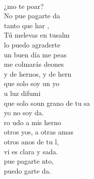 \begin{cancion}%
	    \\
	¿mo te poar?  \\
	No pue pagarte da   \\
	 tanto que har , \\
	Tú melevas en tusalm  \\
\jump
	lo puedo agraderte\\
	un buen día me peas\\
	me colmarás deones\\
	y de hernos, y de hern  \\
\jump
	 que solo soy un yo  \\
	u luz difumi\\
	 que solo soun grano de tu sa \\
	yo no soy da.\\
	ro udo a mis herno\\
	otros yos, a otras amas\\
	otros anos de tu l,\\
	 vi es clara y sada. \\
	 pue pagarte nto,\\
	 puedo garte da.\\
\end{cancion}%
